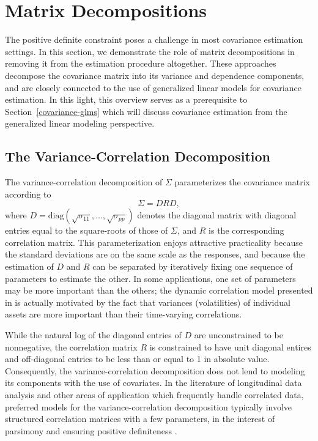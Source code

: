 

\section{Matrix Decompositions} \label{chapter-1-matrix-decompositions}


The positive definite constraint poses a challenge in most covariance estimation settings. In this section, we demonstrate the role of matrix decompositions in removing it from the estimation procedure altogether. These approaches decompose the covariance matrix into its variance and dependence components, and are closely connected to the use of generalized linear models for covariance estimation. In this light, this overview serves as a prerequisite to Section~\ref{covariance-glms} which will discuss covariance estimation from the generalized linear modeling perspective. 


\subsection{The Variance-Correlation Decomposition}

The variance-correlation decomposition of $\Sigma$  parameterizes the covariance matrix according to
\begin{equation}\label{eq:variance-correlation-decomposition}
\Sigma = DRD,
\end{equation}
\noindent
where $D = \mbox{diag}\left(\sqrt{\sigma_{11}},\dots , \sqrt{\sigma_{pp}}\right)$ denotes the diagonal matrix with diagonal entries equal to the square-roots of those of $\Sigma$, and $R$ is the corresponding correlation matrix. This parameterization enjoys attractive practicality because the standard deviations are on the same scale as the responses, and because the estimation of $D$ and $R$ can be separated by iteratively fixing one sequence of parameters to estimate the other. In some applications, one set of parameters may be more important than the others; the dynamic correlation model presented in \cite{engle2002dynamic} is actually motivated by the fact that variances (volatilities) of individual assets are more important than their time-varying correlations.

\bigskip

While the natural log of the diagonal entries of $D$ are unconstrained to be nonnegative, the correlation matrix $R$ is constrained to have unit diagonal entires and off-diagonal entries to be less than or equal to 1 in absolute value. Consequently, the variance-correlation decomposition does not lend to modeling its components with the use of covariates. In the literature of longitudinal data analysis and other areas of application which frequently handle correlated data, preferred models for the variance-correlation decomposition typically involve structured correlation matrices with a few parameters, in the interest of parsimony and ensuring positive definiteness \citep{zimmerman1997structured}.


